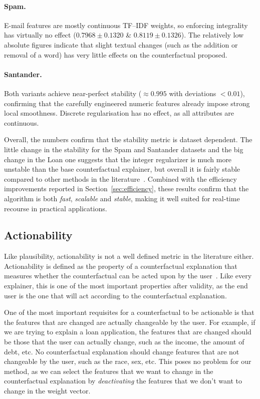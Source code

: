 \documentclass[12pt]{extarticle}
\numberwithin{equation}{section}
\begin{document}
\paragraph{Spam.}
E-mail features are mostly continuous TF–IDF weights, so enforcing integrality has virtually no effect ($0.7968 \pm 0.1320$ \& $0.8119 \pm 0.1326$). The relatively low absolute figures indicate that slight textual changes (such as the addition or removal of a word) has very little effects on the counterfactual proposed.

\paragraph{Santander.} Both variants achieve near-perfect stability ($\approx0.995$ with deviations $<\!0.01$), confirming that the carefully engineered numeric features already impose strong local smoothness. Discrete regularisation has no effect, as all attributes are continuous.

Overall, the numbers confirm that the stability metric is dataset dependent. The little change in the stability for the Spam and Santander datasets and the big change in the Loan one suggests that the integer regularizer is much more unstable than the base counterfactual explainer, but overall it is fairly stable compared to other methods in the literature~\cite{bodria2023benchmarking}. Combined with the efficiency improvements reported in Section~\ref{sec:efficiency}, these results confirm that the algorithm is both \emph{fast}, \emph{scalable} and \emph{stable}, making it well suited for real-time recourse in practical applications.

\subsection{Actionability} \label{sec:actionability}
Like plausibility, actionability is not a well defined metric in the literature either. Actionability is defined as the property of a counterfactual explanation that measures whether the counterfactual can be acted upon by the user~\cite{guidotti2024counterfactual}. Like every explainer, this is one of the most important properties after validity, as the end user is the one that will act according to the counterfactual explanation. 

One of the most important requisites for a counterfactual to be actionable is that the features that are changed are actually changeable by the user. For example, if we are trying to explain a loan application, the features that are changed should be those that the user can actually change, such as the income, the amount of debt, etc. No counterfactual explanation should change features that are not changeable by the user, such as the race, sex, etc. This poses no problem for our method, as we can select the features that we want to change in the counterfactual explanation by \emph{deactivating} the features that we don't want to change in the weight vector. 
\end{document}
